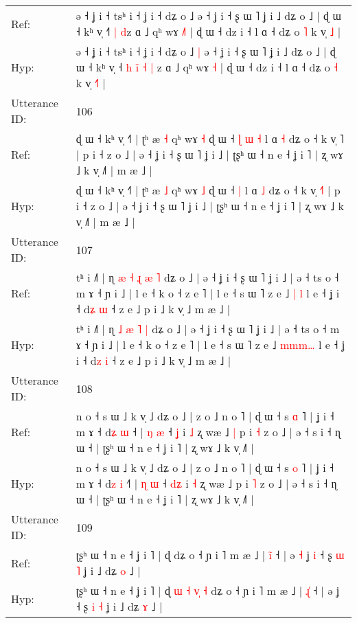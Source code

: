 \documentclass[10pt]{article}
\DeclareRobustCommand{\hl}[1]{{\textcolor{red}{#1}}}
\begin{document}
\begin{longtable}{ll}
Ref: & ə ˧ ʝ i ˧ tsʰ i ˧ ʝ i ˧ dʑ o ˩\hl{}\hl{} ə ˧ ʝ i ˧ ʂ ɯ ˥ ʝ i ˩ dʑ o ˩ | ɖ ɯ ˧ kʰ v̩ ˧\hl{}\hl{}\hl{}\hl{}\hl{˥} \hl{|} \hl{}\hl{d}z ɑ ˩ qʰ wɤ \hl{˩}\hl{˥} | ɖ ɯ ˧ dz i ˧ l ɑ ˧ dʑ o \hl{˥} k v̩ \hl{}\hl{˩} |
 \\
Hyp: & ə ˧ ʝ i ˧ tsʰ i ˧ ʝ i ˧ dʑ o ˩\hl{ }\hl{|} ə ˧ ʝ i ˧ ʂ ɯ ˥ ʝ i ˩ dʑ o ˩ | ɖ ɯ ˧ kʰ v̩ ˧\hl{ }\hl{h}\hl{ }\hl{i}\hl{̃} \hl{˧} \hl{|}\hl{ }z ɑ ˩ qʰ wɤ \hl{}\hl{˧} | ɖ ɯ ˧ dz i ˧ l ɑ ˧ dʑ o \hl{˧} k v̩ \hl{˧}\hl{˥} |
 \\
\midrule
Utterance ID: & 106 \\
Ref: & ɖ ɯ ˧ kʰ v̩ ˧˥ | ʈʰ æ \hl{˧} qʰ wɤ \hl{˧} ɖ ɯ ˧\hl{ }\hl{ɭ}\hl{ }\hl{ɯ} \hl{˧} l ɑ \hl{˧} dʑ o ˧ k v̩ \hl{}˥ | p i ˧ z o ˩ | ə ˧ ʝ i ˧ ʂ ɯ ˥ ʝ i ˩ | ʈʂʰ ɯ ˧ n e ˧ ʝ i ˥ | ʐ wɤ ˩ k v̩ ˩˥ | m æ ˩ |
 \\
Hyp: & ɖ ɯ ˧ kʰ v̩ ˧˥ | ʈʰ æ \hl{˩} qʰ wɤ \hl{˩} ɖ ɯ ˧\hl{}\hl{}\hl{}\hl{} \hl{|} l ɑ \hl{˩} dʑ o ˧ k v̩ \hl{˧}˥ | p i ˧ z o ˩ | ə ˧ ʝ i ˧ ʂ ɯ ˥ ʝ i ˩ | ʈʂʰ ɯ ˧ n e ˧ ʝ i ˥ | ʐ wɤ ˩ k v̩ ˩˥ | m æ ˩ |
 \\
\midrule
Utterance ID: & 107 \\
Ref: & tʰ i ˩˥ | ɳ\hl{ }\hl{æ} \hl{˧} \hl{ɻ} \hl{æ} \hl{˥} dʑ o ˩ | ə ˧ ʝ i ˧ ʂ ɯ ˥ ʝ i ˩ | ə ˧ ts o ˧ m ɤ ˧ ɲ i ˩ | l e ˧ k o ˧ z e ˥ | l e ˧ s ɯ ˥ z e ˩ \hl{}\hl{|}\hl{ }\hl{l} l e ˧ ʝ i ˧ d\hl{ʑ} \hl{ɯ} ˧ z e ˩ p i ˩ k v̩ ˩ m æ ˩ |
 \\
Hyp: & tʰ i ˩˥ | ɳ\hl{}\hl{} \hl{˩} \hl{æ} \hl{˥} \hl{|} dʑ o ˩ | ə ˧ ʝ i ˧ ʂ ɯ ˥ ʝ i ˩ | ə ˧ ts o ˧ m ɤ ˧ ɲ i ˩ | l e ˧ k o ˧ z e ˥ | l e ˧ s ɯ ˥ z e ˩ \hl{m}\hl{m}\hl{m}\hl{…} l e ˧ ʝ i ˧ d\hl{z} \hl{i} ˧ z e ˩ p i ˩ k v̩ ˩ m æ ˩ |
 \\
\midrule
Utterance ID: & 108 \\
Ref: & n o ˧ s ɯ ˩ k v̩ ˩ dʑ o ˩ | z o ˩ n o ˥ | ɖ ɯ ˧ s \hl{ɑ} ˥ | ʝ i ˧ m ɤ ˧ d\hl{ʑ} \hl{ɯ} ˧\hl{} | \hl{ŋ} \hl{æ} ˧ \hl{}\hl{ʝ} i \hl{˩} ʐ wæ ˩\hl{ }\hl{|} p i \hl{˧} z o ˩ | ə ˧ s i ˧ ɳ ɯ ˧ | ʈʂʰ ɯ ˧ n e ˧ ʝ i ˥ | ʐ wɤ ˩ k v̩ ˩˥ |
 \\
Hyp: & n o ˧ s ɯ ˩ k v̩ ˩ dʑ o ˩ | z o ˩ n o ˥ | ɖ ɯ ˧ s \hl{o} ˥ | ʝ i ˧ m ɤ ˧ d\hl{z} \hl{i} ˧\hl{˥} | \hl{ɳ} \hl{ɯ} ˧ \hl{d}\hl{ʑ} i \hl{˧} ʐ wæ ˩\hl{}\hl{} p i \hl{˥} z o ˩ | ə ˧ s i ˧ ɳ ɯ ˧ | ʈʂʰ ɯ ˧ n e ˧ ʝ i ˥ | ʐ wɤ ˩ k v̩ ˩˥ |
 \\
\midrule
Utterance ID: & 109 \\
Ref: & ʈʂʰ ɯ ˧ n e ˧ ʝ i ˥ | ɖ\hl{}\hl{}\hl{}\hl{}\hl{}\hl{}\hl{}\hl{}\hl{} dʑ o ˧ ɲ i ˥ m æ ˩ | \hl{i}\hl{̃} ˧ | ə\hl{ }\hl{˧} ʝ\hl{ }\hl{i} ˧ ʂ \hl{ɯ} \hl{˥} ʝ i ˩ dʑ \hl{o} ˩ |
 \\
Hyp: & ʈʂʰ ɯ ˧ n e ˧ ʝ i ˥ | ɖ\hl{ }\hl{ɯ}\hl{ }\hl{˧}\hl{ }\hl{v}\hl{̩}\hl{ }\hl{˧} dʑ o ˧ ɲ i ˥ m æ ˩ | \hl{ɻ}\hl{̍} ˧ | ə\hl{}\hl{} ʝ\hl{}\hl{} ˧ ʂ \hl{i} \hl{˧} ʝ i ˩ dʑ \hl{ɤ} ˩ |
 \\
\midrule
\end{longtable}
\end{document}
